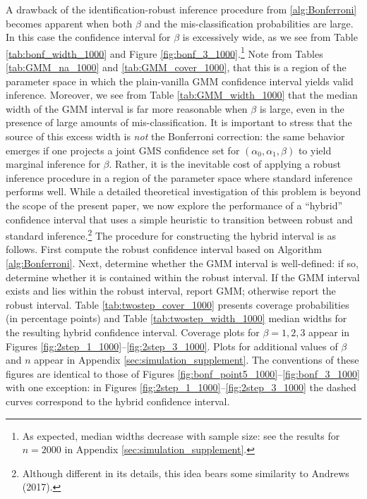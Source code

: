 A drawback of the identification-robust inference procedure from \ref{alg:Bonferroni} becomes apparent when both $\beta$ and the mis-classification probabilities are large.
In this case the confidence interval for $\beta$ is excessively wide, as we see from Table \ref{tab:bonf_width_1000} and Figure \ref{fig:bonf_3_1000}.\footnote{As expected, median widths decrease with sample size: see the results for $n = 2000$ in Appendix \ref{sec:simulation_supplement}.}
Note from Tables \ref{tab:GMM_na_1000} and \ref{tab:GMM_cover_1000}, that this is a region of the parameter space in which the plain-vanilla GMM confidence interval yields valid inference.
Moreover, we see from Table \ref{tab:GMM_width_1000} that the median width of the GMM interval is far more reasonable when $\beta$ is large, even in the presence of large amounts of mis-classification.
It is important to stress that the source of this excess width is \emph{not} the Bonferroni correction: the same behavior emerges if one projects a joint GMS confidence set for $(\alpha_0, \alpha_1, \beta)$ to yield marginal inference for $\beta$.
Rather, it is the inevitable cost of applying a robust inference procedure in a region of the parameter space where standard inference performs well.
While a detailed theoretical investigation of this problem is beyond the scope of the present paper, we now explore the performance of a ``hybrid'' confidence interval that uses a simple heuristic to transition between robust and standard inference.\footnote{Although different in its details, this idea bears some similarity to Andrews (2017).}
The procedure for constructing the hybrid interval is as follows.
First compute the robust confidence interval based on Algorithm \ref{alg:Bonferroni}.
Next, determine whether the GMM interval is well-defined: if so, determine whether it is contained within the robust interval.
If the GMM interval exists and lies within the robust interval, report GMM; otherwise report the robust interval.
Table \ref{tab:twostep_cover_1000} presents coverage probabilities (in percentage points) and Table \ref{tab:twostep_width_1000} median widths for the resulting hybrid confidence interval.
Coverage plots for $\beta = 1, 2, 3$ appear in Figures \ref{fig:2step_1_1000}--\ref{fig:2step_3_1000}.
Plots for additional values of $\beta$ and $n$ appear in Appendix \ref{sec:simulation_supplement}.
The conventions of these figures are identical to those of Figures \ref{fig:bonf_point5_1000}--\ref{fig:bonf_3_1000} with one exception: in Figures \ref{fig:2step_1_1000}--\ref{fig:2step_3_1000} the dashed curves correspond to the hybrid confidence interval.

